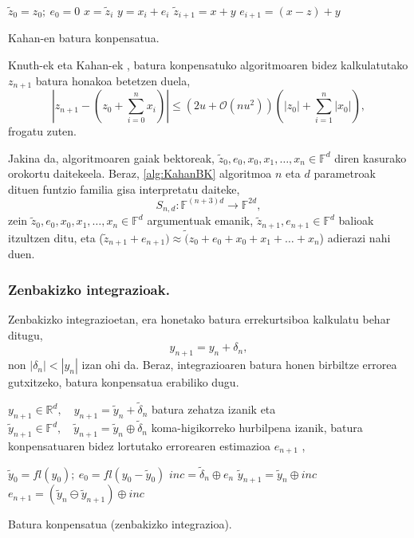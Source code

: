 \begin{algorithm}[H]
 \BlankLine
  $\tilde z_0= z_0; \ e_0=0$\;
  {
   \BlankLine
    $x=\tilde z_i$\;
    $y= x_i+e_i$\;
    $\tilde z_{i+1}=x+y$\;
    $e_{i+1}=(x-z)+y$\;
   \BlankLine
  }
 \caption{Kahan-en batura konpensatua.}
   \label{alg:KahanBK}
\end{algorithm}

Knuth-ek eta Kahan-ek \cite{Muller2009},  batura konpensatuko algoritmoaren bidez kalkulatutako $z_{n+1}$ batura honakoa betetzen duela, 
\begin{equation*}
\left | z_{n+1} - (z_0+\sum_{i=0}^{n} x_i) \right | \leq (2u+ \mathcal{O}(nu^2)) \left(|z_0|+\sum_{i=1}^{n} |x_0|\right),
\end{equation*}
frogatu zuten.

Jakina da, algoritmoaren gaiak bektoreak, $\tilde z_0, e_0, x_0, x_1, \dots, x_n \in \mathbb{F}^d$ diren kasurako orokortu daitekeela. Beraz, \ref{alg:KahanBK} algoritmoa $n$ eta $d$ parametroak dituen funtzio familia gisa interpretatu daiteke,
\begin{equation}
\label{eq:batsd}
S_{n,d} : \mathbb{F}^{(n+3)d} \rightarrow \mathbb{F}^{2d},
\end{equation}
zein $\tilde z_0, e_0, x_0, x_1, \dots, x_n \in \mathbb{F}^d$ argumentuak emanik, $\tilde z_{n+1}, e_{n+1} \in \mathbb{F}^d$ balioak itzultzen ditu, eta ($\tilde z_{n+1}+e_{n+1}) \approx \tilde (z_0+e_0+x_0+x_1+ \dots+x_n$) adierazi nahi duen.

\subsubsection*{Zenbakizko integrazioak.}
 
Zenbakizko integrazioetan, era honetako batura errekurtsiboa kalkulatu behar ditugu,
\begin{equation*}
y_{n+1}=y_n+\delta_n,
\end{equation*}  
non $|\delta_n|<|y_n|$ izan ohi da. Beraz, integrazioaren batura honen birbiltze errorea gutxitzeko, batura konpensatua erabiliko dugu.  

$y_{n+1} \in \mathbb{R}^{d},\quad y_{n+1}=\tilde y_{n}+\tilde \delta_n$ batura zehatza izanik eta $\tilde y_{n+1} \in \mathbb{F}^{d}, \quad \tilde y_{n+1}=\tilde y_{n} \oplus \tilde \delta_n$ koma-higikorreko hurbilpena izanik, batura konpensatuaren bidez lortutako errorearen estimazioa $e_{n+1}$ ,

\begin{algorithm}[H]
 \BlankLine
  $\tilde{y}_{0}=fl(y_{0}); \ e_0=fl(y_0-\tilde{y}_0)$\;
 \BlankLine
  {
   \BlankLine
    $inc=\tilde {\delta}_n \oplus e_n$\;
    $\tilde {y}_{n+1}=\tilde{y}_n \oplus inc$\;
    $e_{n+1}=(\tilde{y}_n \ominus \tilde {y}_{n+1}) \oplus inc$\;
   \BlankLine
  }
 \caption{Batura konpensatua (zenbakizko integrazioa).}
 \label{alg:batkp}
\end{algorithm}

